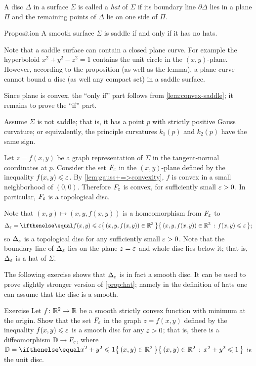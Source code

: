 A disc $\Delta$ in a surface $\Sigma$ is called a \emph{hat} of $\Sigma$
if its boundary line $\partial\Delta$ lies in a plane $\Pi$ and the remaining points of $\Delta$ lie on one side of $\Pi$.

\begin{thm}{Proposition}\label{prop:hat}
A smooth surface $\Sigma$ is saddle if and only if it has no hats.
\end{thm}

Note that a saddle surface can contain a closed plane curve.
For example the hyperboloid $x^2+y^2-z^2=1$ contains the unit circle in the $(x,y)$-plane.
However, according to the proposition (as well as the lemma), a plane curve cannot bound a disc (as well any compact set) in a saddle surface.

Since plane is convex, the ``only if'' part follows from \ref{lem:convex-saddle};
it remains to prove the ``if'' part.

Assume $\Sigma$ is not saddle; that is, it has a point $p$ with strictly positive Gauss curvature;
or equivalently, the principle curvatures $k_1(p)$ and $k_2(p)$ have the same sign.


Let $z=f(x,y)$ be a graph representation of $\Sigma$ in the tangent-normal coordinates at $p$.
Consider the set $F_\varepsilon$ in the $(x,y)$-plane defined by the inequality $f(x,y)\leqslant \varepsilon$.
By \ref{lem:gauss+=>convexity}, $f$ is convex in a small neighborhood of $(0,0)$.
Therefore $F_\varepsilon$ is convex, for sufficiently small $\varepsilon>0$.
In particular, $F_\varepsilon$ is a topological disc.

Note that $(x,y)\mapsto (x,y,f(x,y))$ is a homeomorphism from $F_\varepsilon$
to
\[\Delta_\eps=\set{(x,y,f(x,y))\in \RR^3}{f(x,y)\le \eps};\]
so $\Delta_\varepsilon$ is a topological disc for any sufficiently small $\varepsilon>0$.
Note that the boundary line of $\Delta_\varepsilon$ lies on the plane $z=\varepsilon$ and whole disc lies below it;
that is, $\Delta_\varepsilon$ is a hat of $\Sigma$.
\qeds

The following exercise shows that $\Delta_\varepsilon$ is in fact a smooth disc.
It can be used to prove slightly stronger version of \ref{prop:hat};
namely in the definition of hats one can assume that the disc is a smooth.

\begin{thm}{Exercise}\label{ex:disc-hat}
Let $f\colon\mathbb{R}^2\to\mathbb{R}$ be a smooth strictly convex function with minimum at the origin.
Show that the set $F_\varepsilon$ in the graph $z=f(x,y)$ defined by the inequality $f(x,y)\leqslant \varepsilon$ is a smooth disc for any $\varepsilon>0$;
that is, there is a diffeomorphism 
$\mathbb{D}\to F_\varepsilon$, where $\DD\z=\set{(x,y)\in\RR^2}{x^2+y^2\le 1}$ is the unit disc.
\end{thm}

